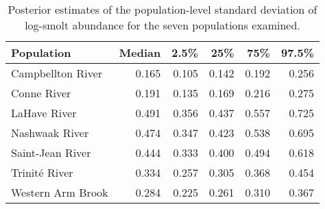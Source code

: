\begin{table}[ht]
\centering
\caption{Posterior estimates of the population-level standard 
                    deviation of log-smolt abundance for the seven populations examined.} 
\begin{tabular}{lrrrrr}
  \hline
Population & Median & 2.5\% & 25\% & 75\% & 97.5\% \\ 
  \hline
Campbellton River & 0.165 & 0.105 & 0.142 & 0.192 & 0.256 \\ 
  Conne River & 0.191 & 0.135 & 0.169 & 0.216 & 0.275 \\ 
  LaHave River & 0.491 & 0.356 & 0.437 & 0.557 & 0.725 \\ 
  Nashwaak River & 0.474 & 0.347 & 0.423 & 0.538 & 0.695 \\ 
  Saint-Jean River & 0.444 & 0.333 & 0.400 & 0.494 & 0.618 \\ 
  Trinité River & 0.334 & 0.257 & 0.305 & 0.368 & 0.454 \\ 
  Western Arm Brook & 0.284 & 0.225 & 0.261 & 0.310 & 0.367 \\ 
   \hline
\end{tabular}
\end{table}
